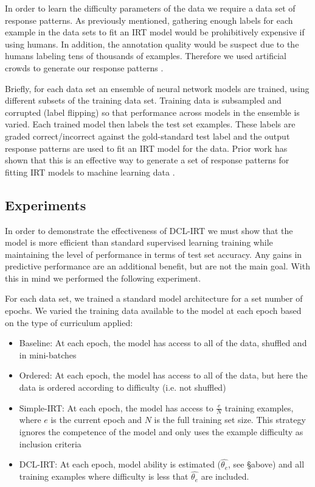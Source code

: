 \documentclass[letterpaper]{article} %
\begin{document}
In order to learn the difficulty parameters of the data we require a data set of response patterns.
As previously mentioned, gathering enough labels for each example in the data sets to fit an IRT model would be prohibitively expensive if using humans.
In addition, the annotation quality would be suspect due to the humans labeling tens of thousands of examples.
Therefore we used artificial crowds to generate our response patterns \cite{lalor_learning_2019}. 

Briefly, for each data set an ensemble of neural network models are trained, using different subsets of the training data set.
Training data is subsampled and corrupted (label flipping) so that performance across models in the ensemble is varied.
Each trained model then labels the test set examples.
These labels are graded correct/incorrect against the gold-standard test label and the output response patterns are used to fit an IRT model for the data.
Prior work has shown that this is an effective way to generate a set of response patterns for fitting IRT models to machine learning data \cite{lalor_learning_2019}.


\subsection{Experiments} 

In order to demonstrate the effectiveness of DCL-IRT we must show that the model is more efficient than standard supervised learning training while maintaining the level of performance in terms of test set accuracy. 
Any gains in predictive performance are an additional benefit, but are not the main goal.
With this in mind we performed the following experiment.

For each data set, we trained a standard model architecture for a set number of epochs. 
We varied the training data available to the model at each epoch based on the type of curriculum applied:

\begin{itemize}
	\item 
	Baseline: At each epoch, the model has access to all of the data, shuffled and in mini-batches
	\item 
	Ordered: At each epoch, the model has access to all of the data, but here the data is ordered according to difficulty (i.e. not shuffled) 
	\item 
	Simple-IRT: At each epoch, the model has access to $\frac{e}{N}$ training examples, where $e$ is the current epoch and $N$ is the full training set size. 
	This strategy ignores the competence of the model and only uses the example difficulty as inclusion criteria
	\item 
	DCL-IRT: At each epoch, model ability is estimated ($\hat{\theta_e}$, see \S above) and all training examples where difficulty is less that $\hat{\theta_e}$ are included.
\end{itemize}
\end{document}
